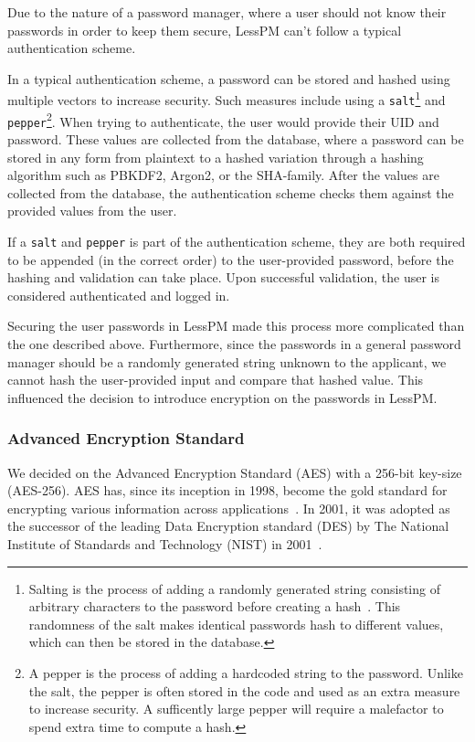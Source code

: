 
Due to the nature of a password manager, where a user should not know their
passwords in order to keep them secure, LessPM can't follow a typical
authentication scheme.

In a typical authentication scheme, a password can be stored and hashed using
multiple vectors to increase security.
Such measures include using a \texttt{salt}\footnote{
  Salting is the process of adding a randomly generated string consisting of
  arbitrary characters to the password before creating a hash~\cite{Kharod2015}.
  This randomness of the salt makes identical passwords hash to different
  values, which can then be stored in the database.
} and \texttt{pepper}\footnote{
  A pepper is the process of adding a hardcoded string to the password.
  Unlike the salt, the pepper is often stored in the code and used as an
  extra measure to increase security.
  A sufficently large pepper will require a malefactor to spend extra time to
  compute a hash.
}.
When trying to authenticate, the user would provide their UID and password.
These values are collected from the database, where a password can be stored in
any form from plaintext to a hashed variation through a hashing algorithm
such as PBKDF2, Argon2, or the SHA-family.
After the values are collected from the database, the authentication scheme
checks them against the provided values from the user.

If a \texttt{salt} and \texttt{pepper} is part of the authentication scheme,
they are both required to be appended (in the correct order) to the
user-provided password, before the hashing and validation can take place.
Upon successful validation, the user is considered authenticated and logged in.

Securing the user passwords in LessPM made this process more complicated than
the one described above.
Furthermore, since the passwords in a general password manager should be a
randomly generated string unknown to the applicant, we cannot hash the
user-provided input and compare that hashed value.
This influenced the decision to introduce encryption on the passwords in
LessPM\@.

\subsubsection{Advanced Encryption Standard}
We decided on the Advanced Encryption Standard (AES) with a 256-bit key-size
(AES-256).
AES has, since its inception in 1998, become the gold standard for encrypting
various information across
applications~\cite{schneier2015applied,rijndael_book}.
In 2001, it was adopted as the successor of the leading Data Encryption
standard (DES) by The National Institute of Standards and Technology (NIST)
in 2001~\cite{nist_aes_winner}.

